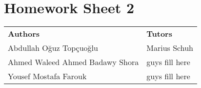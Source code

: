 \documentclass{article}
\begin{document}
\section*{\huge Homework Sheet 2}
\begin{flushright}
  \begin{tabular}{@{} l l @{}}
    \textbf{Authors} & \textbf{Tutors} \\
    Abdullah Oğuz Topçuoğlu & Marius Schuh \\
    Ahmed Waleed Ahmed Badawy Shora & guys fill here \\
    Yousef Mostafa Farouk & guys fill here \\
  \end{tabular}
\end{flushright}

\end{document}
